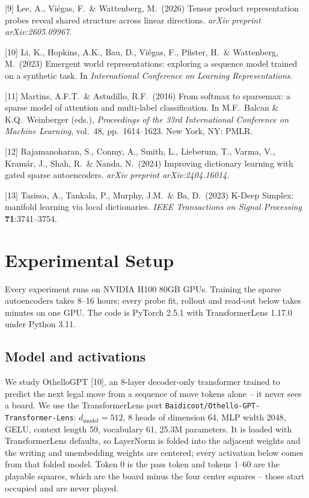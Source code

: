 \documentclass{article}
\begin{document}
{[9] Lee, A., Vi\'egas, F.\ \& Wattenberg, M.\ (2026) Tensor product representation probes reveal
shared structure across linear directions. {\it arXiv preprint arXiv:2605.09967}.


[10] Li, K., Hopkins, A.K., Bau, D., Vi\'egas, F., Pfister, H.\ \& Wattenberg, M.\ (2023) Emergent
world representations: exploring a sequence model trained on a synthetic task. In {\it
International Conference on Learning Representations}.


[11] Martins, A.F.T.\ \& Astudillo, R.F.\ (2016) From softmax to sparsemax: a sparse model of
attention and multi-label classification. In M.F.\ Balcan \& K.Q.\ Weinberger (eds.), {\it
Proceedings of the 33rd International Conference on Machine Learning}, vol.\ 48, pp.\ 1614--1623.
New York, NY: PMLR.


[12] Rajamanoharan, S., Conmy, A., Smith, L., Lieberum, T., Varma, V., Kram\'ar, J., Shah, R.\ \&
Nanda, N.\ (2024) Improving dictionary learning with gated sparse autoencoders. {\it arXiv
preprint arXiv:2404.16014}.


[13] Tasissa, A., Tankala, P., Murphy, J.M.\ \& Ba, D.\ (2023) K-Deep Simplex: manifold learning
via local dictionaries. {\it IEEE Transactions on Signal Processing} {\bf 71}:3741--3754.
}




\appendix

\section{Experimental Setup}

Every experiment runs on NVIDIA H100 80GB GPUs. Training the sparse autoencoders takes 8--16
hours; every probe fit, rollout and read-out below takes minutes on one GPU. The code is PyTorch
2.5.1 with TransformerLens 1.17.0 under Python 3.11.

\subsection{Model and activations}

We study OthelloGPT [10], an 8-layer decoder-only transformer trained to
predict the next legal move from a sequence of move tokens alone -- it never sees a board. We
use the TransformerLens port \texttt{Baidicoot/Othello-GPT-Transformer-Lens}: $d_{\mathrm{model}} =
512$, 8 heads of dimension 64, MLP width 2048, GELU, context length 59, vocabulary 61, 25.3M
parameters. It is loaded with TransformerLens defaults, so LayerNorm is folded into the
adjacent weights and the writing and unembedding weights are centered; every activation below
comes from that folded model. Token 0 is the pass token and tokens 1--60 are the playable
squares, which are the board minus the four center squares -- those start occupied and are
never played.
\end{document}
